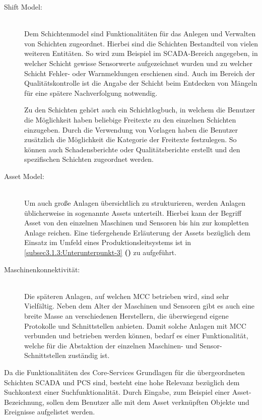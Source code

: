 \begin{description}

    \item[Shift Model:]\hfill \\
    Dem Schichtenmodel sind Funktionalitäten für das Anlegen und Verwalten von Schichten zugeordnet. Hierbei sind die Schichten Bestandteil von vielen weiteren Entitäten. So wird zum Beispiel im SCADA-Bereich angegeben, in welcher Schicht gewisse Sensorwerte aufgezeichnet wurden und zu welcher Schicht Fehler- oder Warnmeldungen erschienen sind. Auch im Bereich der Qualitätskontrolle ist die Angabe der Schicht beim Entdecken von Mängeln für eine spätere Nachverfolgung notwendig.

    Zu den Schichten gehört auch ein Schichtlogbuch, in welchem die Benutzer die Möglichkeit haben beliebige Freitexte zu den einzelnen Schichten einzugeben. Durch die Verwendung von Vorlagen haben die Benutzer zusätzlich die Möglichkeit die Kategorie der Freitexte festzulegen. So können auch Schadensberichte oder Qualitätsberichte erstellt und den spezifischen Schichten zugeordnet werden.

    \item[Asset Model:]\hfill \\
    Um auch große Anlagen übersichtlich zu strukturieren, werden Anlagen üblicherweise in sogenannte \glqq Assets\grqq{} unterteilt. Hierbei kann der Begriff \glqq Asset\grqq{} von den einzelnen Maschinen und Sensoren bis hin zur kompletten Anlage reichen. Eine tiefergehende Erläuterung der \glqq Assets\grqq{} bezüglich dem Einsatz im Umfeld eines Produktionsleitsystems ist in \autoref{subsec3.1.3:Unterunterpunkt-3} \textbf{()} zu aufgeführt.
    
    \item[Maschinenkonnektivität:]\hfill \\
    Die späteren Anlagen, auf welchen MCC betrieben wird, sind sehr Vielfältig. Neben dem Alter der Maschinen und Sensoren gibt es auch eine breite Masse an verschiedenen Herstellern, die überwiegend eigene Protokolle und Schnittstellen anbieten. Damit solche Anlagen mit MCC verbunden und betrieben werden können, bedarf es einer Funktionalität, welche für die Abstaktion der einzelnen Maschinen- und Sensor-Schnittstellen zuständig ist.

\end{description}

Da die Funktionalitäten des Core-Services Grundlagen für die übergeordneten Schichten \glqq SCADA\grqq{} und \glqq PCS\grqq{} sind, besteht eine hohe Relevanz bezüglich dem Suchkontext einer Suchfunktionalität. Durch Eingabe, zum Beispiel einer Asset-Bezeichnung, sollen dem Benutzer alle mit dem Asset verknüpften Objekte und Ereignisse aufgelistet werden.

